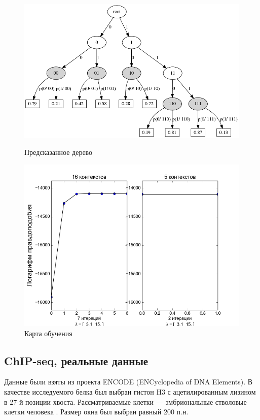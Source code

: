 \documentclass{matmex-diploma-custom}
\begin{document}
\begin{itemize}
\begin{enumerate}
\begin{figure}[h!]
\begin{minipage}[b]{0.49 \textwidth}
\end{minipage}
\hfil \hfil%
\begin{minipage}[b]{0.49 \textwidth}
	\includegraphics[scale=0.3]{img/sample/predicted_trie.png}
	\centering
	\caption{ Предсказанное дерево }
	\label{ris:sample_predicted_trie}
\end{minipage}
\begin{minipage}[b]{0.8 \textwidth}
	\includegraphics[scale=0.4]{img/sample/plot_.png}
	\centering
	\caption{ Карта обучения }
	\label{ris:sample_log_likelihood}
\end{minipage}
\end{figure}
\end{enumerate}
\end{itemize}


\subsection{ChIP-seq, реальные данные}
Данные были взяты из проекта ENCODE (ENCyclopedia of DNA Elements).
В качестве исследуемого белка был выбран гистон H3 с ацетилированным лизином в 27-й позиции хвоста. Рассматриваемые клетки --- эмбриональные стволовые клетки человека \cite{ENCODE}.
Размер окна был выбран равный 200 п.н.
\end{document}

